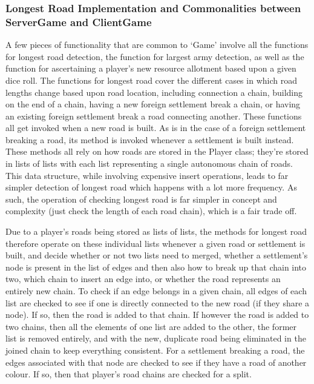 \documentclass[a4paper,doc,draftfirst]{apa6}
\begin{document}
\subsubsection{Longest Road Implementation and Commonalities between ServerGame and ClientGame}
A few pieces of functionality that are common to ‘Game’ involve all the functions for longest road detection, the function for largest army detection, as well as the function for ascertaining a player’s new resource allotment based upon a given dice roll. The functions for longest road cover the different cases in which road lengths change based upon road location, including connection a chain, building on the end of a chain, having a new foreign settlement break a chain, or having an existing foreign settlement break a road connecting another. These functions all get invoked when a new road is built. As is in the case of a foreign settlement breaking a road, its method is invoked whenever a settlement is built instead. These methods all rely on how roads are stored in the Player class; they’re stored in lists of lists with each list representing a single autonomous chain of roads. This data structure, while involving expensive insert operations, leads to far simpler detection of longest road which happens with a lot more frequency. As such, the operation of checking longest road is far simpler in concept and complexity (just check the length of each road chain), which is a fair trade off.

Due to a player’s roads being stored as lists of lists, the methods for longest road therefore operate on these individual lists whenever a given road or settlement is built, and decide whether or not two lists need to merged, whether a settlement’s node is present in the list of edges and then also how to break up that chain into two, which chain to insert an edge into, or whether the road represents an entirely new chain. To check if an edge belongs in a given chain, all edges of each list are checked to see if one is directly connected to the new road (if they share a node). If so, then the road is added to that chain. If however the road is added to two chains, then all the elements of one list are added to the other, the former list is removed entirely, and with the new, duplicate road being eliminated in the joined chain to keep everything consistent.  For a settlement breaking a road, the edges associated with that node are checked to see if they have a road of another colour. If so, then that player’s road chains are checked for a split.
\end{document}
